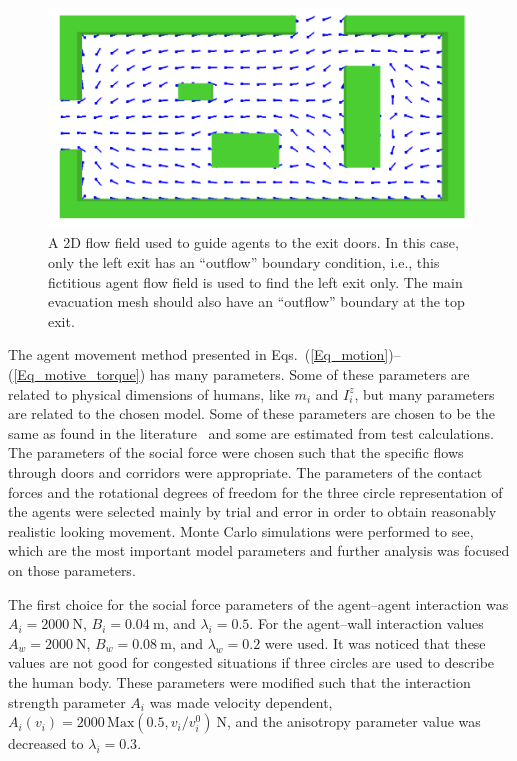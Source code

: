 \documentclass[12pt,a4paper,final,twoside]{stylevk}
\begin{document}
%
\begin{figure}[!tb]
  \centerline{\includegraphics[clip=true,width=120mm]{FIGURES/evac_ffield}}
  \caption{A 2D flow field used to guide agents to the exit doors.  In
    this case, only the left exit has an ``outflow'' boundary
    condition, i.e., this fictitious agent flow field is used
    to find the left exit only.  The main evacuation mesh should also
    have an ``outflow'' boundary at the top
    exit.}\label{Fig_EvacFlowField}
\end{figure}
%

The agent movement method presented in
Eqs.~(\ref{Eq_motion})--(\ref{Eq_motive_torque}) has many parameters.
Some of these parameters are related to physical dimensions of humans,
like $m_i$ and $I^z_{i}$, but many parameters are related to the
chosen model.  Some of these parameters are chosen to be the same as
found in the literature~\cite{Helbing00,Langston06} and some are
estimated from test calculations.  The parameters of the social force
were chosen such that the specific flows through doors and corridors
were appropriate.  The parameters of the contact forces and the
rotational degrees of freedom for the three circle representation of
the agents were selected mainly by trial and error in order to obtain
reasonably realistic looking movement.  Monte Carlo simulations were
performed to see, which are the most important model parameters and
further analysis was focused on those parameters.


The first choice for the social force parameters of the agent--agent
interaction was $A_i = 2000~\textrm{N}$, $B_i = 0.04~\textrm{m}$, and
$\lambda_i = 0.5$.  For the agent--wall interaction values $A_w =
2000~\textrm{N}$, $B_w = 0.08~\textrm{m}$, and $\lambda_w = 0.2$ were
used.  It was noticed that these values are not good for congested
situations if three circles are used to describe the human body.
These parameters were modified such that the interaction strength
parameter $A_i$ was made velocity dependent, $A_i(v_i) = 2000\,
\mathrm{Max}(0.5, v_i/v^0_i)~\textrm{N}$, and the anisotropy parameter
value was decreased to $\lambda_i = 0.3$.
\end{document}
